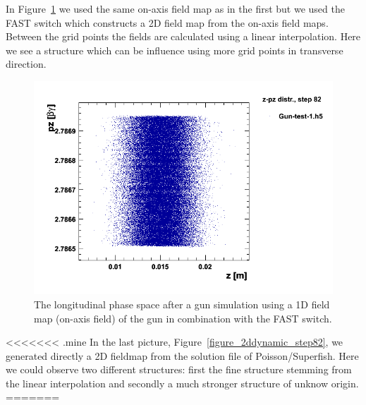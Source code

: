 In Figure~\ref{figure_1ddynamic_fast_step82} we used the same on-axis field map as in the first but we used the FAST switch which constructs a 2D field map from the on-axis field maps. Between the grid points the fields are calculated using a linear interpolation. Here we see a structure which can be influence using more grid points in transverse direction.
\begin{figure}
  \begin{center}
  \includegraphics[origin=bl,height=80mm,angle=0]{./figures/Fieldmaps/1DDynamic_fast_step82.png}
  \caption{\label{figure_1ddynamic_fast_step82}
    The longitudinal phase space after a gun simulation using a 1D field map (on-axis field) of the gun in combination with the FAST switch.
  }
  \end{center}
%
\end{figure}
<<<<<<< .mine
In the last picture, Figure~\ref{figure_2ddynamic_step82}, we generated directly a 2D fieldmap from the solution file of Poisson/Superfish. Here we could observe two different structures: first the fine structure stemming from the linear interpolation and secondly a much stronger structure of unknow origin.
=======

